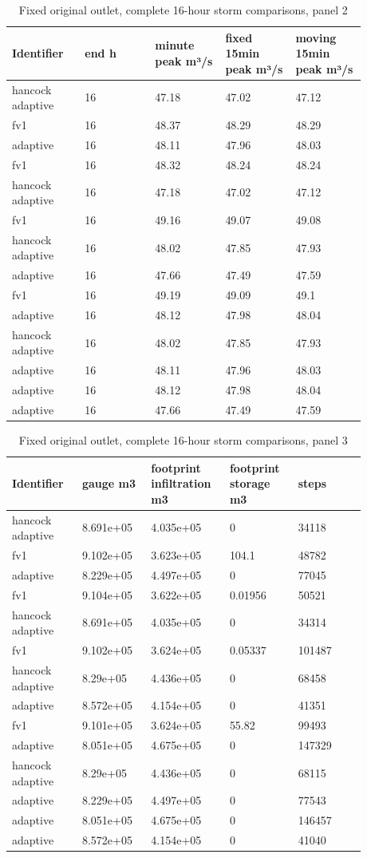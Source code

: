 \begin{longtable}{p{0.1760\linewidth}p{0.1760\linewidth}p{0.1760\linewidth}p{0.1760\linewidth}p{0.1760\linewidth}}
\caption{Fixed original outlet, complete 16-hour storm comparisons, panel 2}\\
\hline
Identifier & end h & minute peak m³/s & fixed 15min peak m³/s & moving 15min peak m³/s \\
\hline\endhead
hancock adaptive & 16 & 47.18 & 47.02 & 47.12 \\
fv1 & 16 & 48.37 & 48.29 & 48.29 \\
adaptive & 16 & 48.11 & 47.96 & 48.03 \\
fv1 & 16 & 48.32 & 48.24 & 48.24 \\
hancock adaptive & 16 & 47.18 & 47.02 & 47.12 \\
fv1 & 16 & 49.16 & 49.07 & 49.08 \\
hancock adaptive & 16 & 48.02 & 47.85 & 47.93 \\
adaptive & 16 & 47.66 & 47.49 & 47.59 \\
fv1 & 16 & 49.19 & 49.09 & 49.1 \\
adaptive & 16 & 48.12 & 47.98 & 48.04 \\
hancock adaptive & 16 & 48.02 & 47.85 & 47.93 \\
adaptive & 16 & 48.11 & 47.96 & 48.03 \\
adaptive & 16 & 48.12 & 47.98 & 48.04 \\
adaptive & 16 & 47.66 & 47.49 & 47.59 \\
\end{longtable}
\begin{longtable}{p{0.1760\linewidth}p{0.1760\linewidth}p{0.1760\linewidth}p{0.1760\linewidth}p{0.1760\linewidth}}
\caption{Fixed original outlet, complete 16-hour storm comparisons, panel 3}\\
\hline
Identifier & gauge m3 & footprint infiltration m3 & footprint storage m3 & steps \\
\hline\endhead
hancock adaptive & 8.691e+05 & 4.035e+05 & 0 & 34118 \\
fv1 & 9.102e+05 & 3.623e+05 & 104.1 & 48782 \\
adaptive & 8.229e+05 & 4.497e+05 & 0 & 77045 \\
fv1 & 9.104e+05 & 3.622e+05 & 0.01956 & 50521 \\
hancock adaptive & 8.691e+05 & 4.035e+05 & 0 & 34314 \\
fv1 & 9.102e+05 & 3.624e+05 & 0.05337 & 101487 \\
hancock adaptive & 8.29e+05 & 4.436e+05 & 0 & 68458 \\
adaptive & 8.572e+05 & 4.154e+05 & 0 & 41351 \\
fv1 & 9.101e+05 & 3.624e+05 & 55.82 & 99493 \\
adaptive & 8.051e+05 & 4.675e+05 & 0 & 147329 \\
hancock adaptive & 8.29e+05 & 4.436e+05 & 0 & 68115 \\
adaptive & 8.229e+05 & 4.497e+05 & 0 & 77543 \\
adaptive & 8.051e+05 & 4.675e+05 & 0 & 146457 \\
adaptive & 8.572e+05 & 4.154e+05 & 0 & 41040 \\
\end{longtable}
